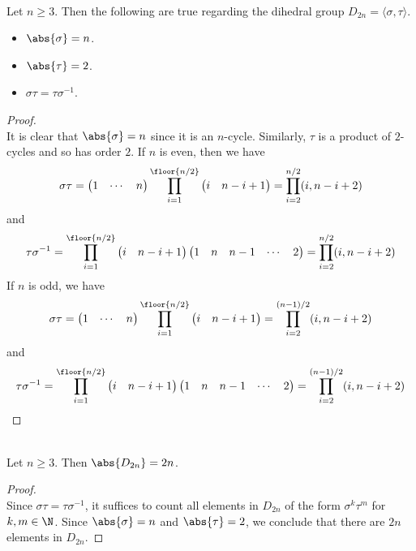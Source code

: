 \documentclass[a4paper]{article}
\begin{document}
\begin{lmm}{}{}\\
Let $n\geq 3$. Then the following are true regarding the dihedral group $D_{2n}=\langle\sigma,\tau\rangle$. 
\begin{itemize}
\item $\abs{\sigma}=n$. 
\item $\abs{\tau}=2$. 
\item $\sigma\tau=\tau\sigma^{-1}$. 
\end{itemize}
\begin{proof}\\
It is clear that $\abs{\sigma}=n$ since it is an $n$-cycle. Similarly, $\tau$ is a product of $2$-cycles and so has order $2$. If $n$ is even, then we have $$\sigma\tau=\begin{pmatrix}1 & \cdots &  n\end{pmatrix}\prod_{i=1}^{\floor{n/2}}\begin{pmatrix}i & n-i+1\end{pmatrix}=\prod_{i=2}^{n/2}(i,n-i+2)$$ and $$\tau\sigma^{-1}=\prod_{i=1}^{\floor{n/2}}\begin{pmatrix}i & n-i+1\end{pmatrix}\begin{pmatrix}1 & n & n-1 & \cdots & 2\end{pmatrix}=\prod_{i=2}^{n/2}(i,n-i+2)$$ If $n$ is odd, we have $$\sigma\tau=\begin{pmatrix}1 & \cdots &  n\end{pmatrix}\prod_{i=1}^{\floor{n/2}}\begin{pmatrix}i & n-i+1\end{pmatrix}=\prod_{i=2}^{(n-1)/2}(i,n-i+2)$$ and $$\tau\sigma^{-1}=\prod_{i=1}^{\floor{n/2}}\begin{pmatrix}i & n-i+1\end{pmatrix}\begin{pmatrix}1 & n & n-1 & \cdots & 2\end{pmatrix}=\prod_{i=2}^{(n-1)/2}(i,n-i+2)$$
\end{proof}
\end{lmm}

\begin{prp}{}{}\\
Let $n\geq 3$. Then $\abs{D_{2n}}=2n$. 
\begin{proof}\\
Since $\sigma\tau=\tau\sigma^{-1}$, it suffices to count all elements in $D_{2n}$ of the form $\sigma^k\tau^m$ for $k,m\in\N$. Since $\abs{\sigma}=n$ and $\abs{\tau}=2$, we conclude that there are $2n$ elements in $D_{2n}$. 
\end{proof}
\end{prp}
\end{document}
